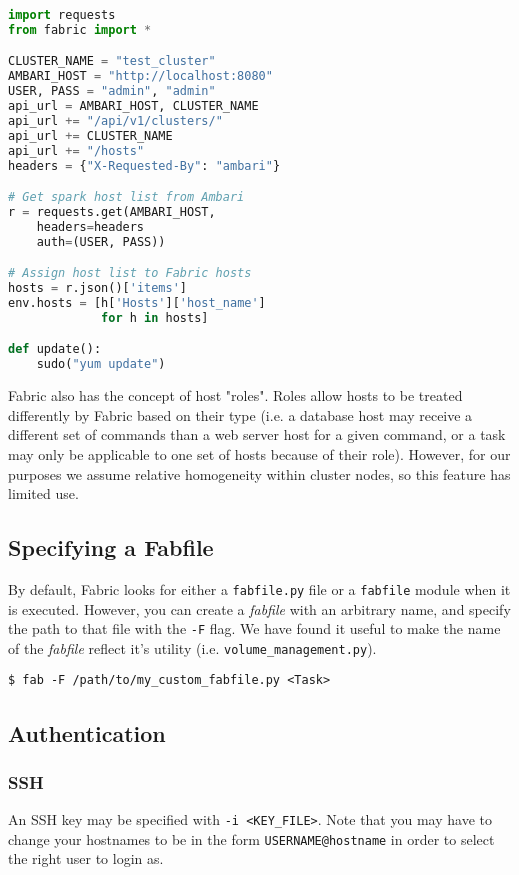 \documentclass[9pt,twocolumn,twoside]{idsi}
\begin{document}
\begin{lstlisting}[language=Python, showstringspaces=false, breaklines=true]
import requests
from fabric import *

CLUSTER_NAME = "test_cluster"
AMBARI_HOST = "http://localhost:8080"
USER, PASS = "admin", "admin"
api_url = AMBARI_HOST, CLUSTER_NAME
api_url += "/api/v1/clusters/"
api_url += CLUSTER_NAME
api_url += "/hosts"
headers = {"X-Requested-By": "ambari"}

# Get spark host list from Ambari
r = requests.get(AMBARI_HOST,
    headers=headers
    auth=(USER, PASS))

# Assign host list to Fabric hosts
hosts = r.json()['items']
env.hosts = [h['Hosts']['host_name']
             for h in hosts]

def update():
    sudo("yum update")
\end{lstlisting}

Fabric also has the concept of host "roles". Roles allow hosts to be treated differently by Fabric based on their type (i.e. a database host may receive a different set of commands than a web server host for a given command, or a task may only be applicable to one set of hosts because of their role). However, for our purposes we assume relative homogeneity within cluster nodes, so this feature has limited use.

\subsection{Specifying a Fabfile}
By default, Fabric looks for either a \texttt{fabfile.py} file or a \texttt{fabfile} module when it is executed. However, you can create a \emph{fabfile} with an arbitrary name, and specify the path to that file with the \texttt{-F} flag. We have found it useful to make the name of the \emph{fabfile} reflect it's utility (i.e. \texttt{volume\_management.py}).

\begin{verbatim}
$ fab -F /path/to/my_custom_fabfile.py <Task>
\end{verbatim}


\subsection{Authentication}
\subsubsection{SSH}
An SSH key may be specified with \texttt{-i <KEY\_FILE>}. Note that you may have to change your hostnames to be in the form \texttt{USERNAME@hostname} in order to select the right user to login as.
\end{document}
